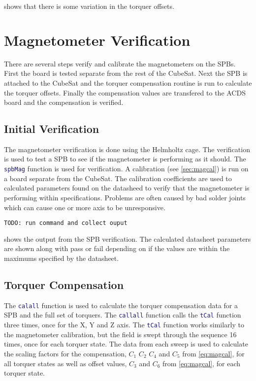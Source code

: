  shows that there is some variation in the torquer offsets. 

\section{Magnetometer Verification}

There are several steps verify and calibrate the magnetometers on the \acp{SPB}. First the board is tested separate from the rest of the CubeSat. Next the \ac{SPB} is attached to the CubeSat and the torquer compensation routine is run to calculate the torquer offsets. Finally the compensation values are transfered to the \ac{ACDS} board and the compensation is verified.


\subsection{Initial Verification}

The magnetometer verification is done using the Helmholtz cage. The verification is used to test a \ac{SPB} to see if the magnetometer is performing as it should. The \lstinline[style=code,language=Matlab]$spbMag$ function is used for verification. A calibration (see \cref{sec:magcal}) is run on a board separate from the CubeSat. The calibration coefficients are used to calculated parameters found on the datasheed to verify that the magnetometer is performing within specifications. Problems are often caused by bad solder joints which can cause one or more axis to be unresponsive. 

\begin{lstlisting}[caption={\ac{SPB} verification results},label={lst:vspb-res},language=verbatim]
TODO: run command and collect ouput
\end{lstlisting}

 shows the output from the \ac{SPB} verification. The calculated datasheet parameters are shown along with pass or fail depending on if the values are within the maximums specified by the datasheet.


\subsection{Torquer Compensation}

\label{sec:tq-comp}

The \lstinline[style=code,language=Matlab]$calall$ function is used to calculate the torquer compensation data for a \ac{SPB} and the full set of torquers. The \lstinline[style=code,language=Matlab]$callall$ function calls the \lstinline[style=code,language=Matlab]$tCal$ function three times, once for the X, Y and Z axis. The \lstinline[style=code,language=Matlab]$tCal$ function works similarly to the magnetometer calibration, but the field is swept through the sequence 16 times, once for each torquer state. The data from each sweep is used to calculate the scaling factors for the compensation, $C_1$ $C_2$ $C_4$ and $C_5$ from \cref{eq:magcal}, for all torquer states as well as offset values, $C_3$ and $C_6$ from \cref{eq:magcal}, for each torquer state.


